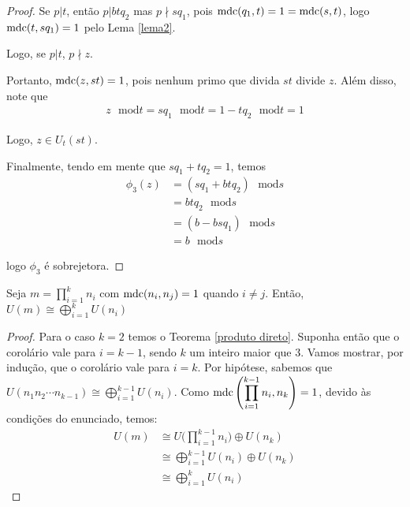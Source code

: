 \begin{proof}
		\par\vspace{0.3cm} Se $p|t$, então $p|btq_2$ mas $p\nmid sq_1$, pois $\operatorname{mdc}(q_1, t) = 1 = \operatorname{mdc}(s,t)$, logo $\operatorname{mdc}(t, sq_1) = 1$ pelo Lema \eqref{lema2}.
		\par\vspace{0.3cm} Logo, se $p|t$, $p\nmid z$.
		\par\vspace{0.3cm} Portanto, $\operatorname{mdc}(z, st) = 1$, pois nenhum primo que divida $st$ divide $z$. Além disso, note que 
		\begin{align*}
		z\text{ }\mathrm{mod} t = sq_1\text{ }\mathrm{mod} t = 1 - tq_2 \text{ }\mathrm{mod} t = 1
		\end{align*} 
		\par\vspace{0.3cm} Logo, $z\in U_t(st)$. 
		\par\vspace{0.3cm} Finalmente, tendo em mente que $sq_1 + tq_2 = 1$, temos
		\begin{align*}
		\phi_3(z) &= (sq_1 + btq_2)\text{ }\mathrm{mod} s \\ &= btq_2\text{ }\mathrm{mod} s \\ &= (b - bsq_1)\text{ }\mathrm{mod} s \\ &= b\text{ }\mathrm{mod} s
		\end{align*}
		\par\vspace{0.3cm}logo $\phi_3$ é sobrejetora.
		
	\end{proof}
	
	
	\begin{corollary}
		\label{produto direto de U(m)}
		Seja $\displaystyle{m = \prod_{i = 1}^{k}n_i}$ com $\operatorname{mdc}(n_i, n_j) = 1$ quando $i\neq j$. Então, 
		$\displaystyle{U(m)\cong\bigoplus_{i = 1}^{k} U(n_i)}$
	\end{corollary}
	
	\begin{proof}
		Para o caso $k = 2$ temos o Teorema \eqref{produto direto}. Suponha então que o corolário vale para $i = k-1$, sendo $k$ um inteiro maior que 3. Vamos mostrar, por indução, que o corolário vale para $i = k$.	Por hipótese, sabemos que $U(n_1n_2\cdots n_{k-1})\cong \displaystyle{\bigoplus_{i=1}^{k-1}U(n_i)}$. Como $\operatorname{mdc} \Bigg(\displaystyle{ \prod_{i=1}^{k-1}n_i }, n_k\Bigg) = 1$, devido às condições do enunciado, temos:
		\begin{align*}
		U(m) &\cong U\Bigg(\displaystyle{\prod_{i=1}^{k-1}n_i}\Bigg)\oplus U(n_k) \\
		&\cong \bigoplus_{i=1}^{k-1}U(n_i)\oplus U(n_k) \\
		&\cong \bigoplus_{i=1}^{k}U(n_i)
		\end{align*}
		
	\end{proof}

